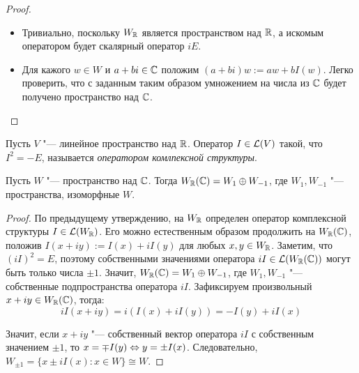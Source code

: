\begin{proof}~
	\begin{itemize}
		\item{}Тривиально, поскольку $W_{\mathbb{R}}$ является пространством над $\mathbb{R}$, а искомым оператором будет скалярный оператор $iE$.
		\item{}Для кажого $w \in W$ и $a + bi \in \mathbb{C}$ положим $(a + bi)w := aw + bI(w)$. Легко проверить, что с заданным таким образом умножением на числа из $\mathbb{C}$ будет получено пространство над $\mathbb{C}$.\qedhere
	\end{itemize}
\end{proof}

\begin{definition}
	Пусть $V$ "--- линейное пространство над $\mathbb{R}$. Оператор $I \in \mathcal L(V)$ такой, что $I^2 = -E$, называется \textit{оператором комлпексной структуры}.
\end{definition}

\begin{proposition}
	Пусть $W$ "--- пространство над $\mathbb{C}$. Тогда $W_{\mathbb{R}}(\mathbb{C}) = W_1 \oplus W_{-1}$, где $W_1, W_{-1}$ "--- пространства, изоморфные $W$.
\end{proposition}

\begin{proof}
	По предыдущему утверждению, на $W_{\mathbb{R}}$ определен оператор комплексной структуры $I \in \mathcal L(W_{\mathbb{R}})$. Его можно естественным образом продолжить на $W_{\mathbb{R}}(\mathbb{C})$, положив $I(x + iy) := I(x) + iI(y)$ для любых $x, y \in W_{\mathbb{R}}$. Заметим, что $(iI)^2 = E$, поэтому собственными значениями оператора $iI \in \mathcal L(W_{\mathbb{R}}(\mathbb{C}))$ могут быть только числа $\pm1$. Значит, $W_{\mathbb{R}}(\mathbb{C}) = W_1 \oplus W_{-1}$, где $W_1, W_{-1}$ "--- собственные подпространства оператора $iI$. Зафиксируем произвольный $x + iy \in W_{\mathbb{R}}(\mathbb{C})$, тогда:
	\[iI(x + iy) = i(I(x) + iI(y)) = -I(y) + iI(x)\]
	
	Значит, если $x + iy$ "--- собственный вектор оператора $iI$ с собственным значением $\pm1$, то $x = \mp I(y) \Leftrightarrow y = \pm I(x)$. Следовательно, $W_{\pm1} = \{x \pm iI(x) : x \in W\} \cong W$.
\end{proof}